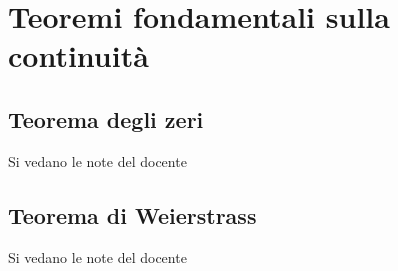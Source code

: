 %
%
%
%


\section{Teoremi fondamentali sulla continuità}

\subsection{Teorema degli zeri}
Si vedano le note del docente

\subsection{Teorema di Weierstrass}
Si vedano le note del docente
